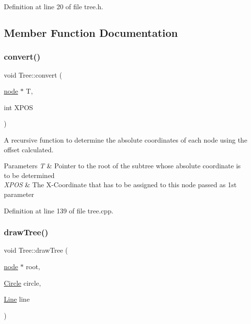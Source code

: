 Definition at line 20 of file tree.\+h.



\subsection{Member Function Documentation}
\mbox{\label{class_tree_a139d5988d1628db018c77c3c1be4d100}} 
\subsubsection{\texorpdfstring{convert()}{convert()}}
{\footnotesize\ttfamily void Tree\+::convert (\begin{DoxyParamCaption}\item[{\mbox{\hyperlink{structnode}{node}} $\ast$}]{T,  }\item[{int}]{X\+P\+OS }\end{DoxyParamCaption})\hspace{0.3cm}{\ttfamily [static]}}



A recursive function to determine the absolute coordinates of each node using the offset calculated. 


\begin{DoxyParams}{Parameters}
{\em T} & Pointer to the root of the subtree whose absolute coordinate is to be determined \\
\hline
{\em X\+P\+OS} & The X-\/\+Coordinate that has to be assigned to this node passed as 1st parameter \\
\hline
\end{DoxyParams}


Definition at line 139 of file tree.\+cpp.

\mbox{\label{class_tree_a659552e2bba706aece274617c1f36f01}} 
\subsubsection{\texorpdfstring{draw\+Tree()}{drawTree()}}
{\footnotesize\ttfamily void Tree\+::draw\+Tree (\begin{DoxyParamCaption}\item[{\mbox{\hyperlink{structnode}{node}} $\ast$}]{root,  }\item[{\mbox{\hyperlink{class_circle}{Circle}}}]{circle,  }\item[{\mbox{\hyperlink{class_line}{Line}}}]{line }\end{DoxyParamCaption})}



